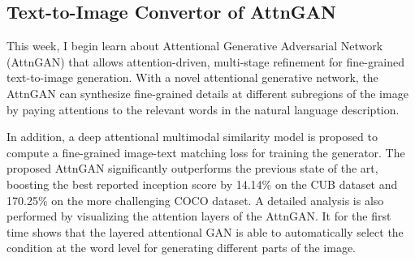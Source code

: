 \documentclass[a4paper]{article}
\begin{document}
	\subsection{Text-to-Image Convertor of AttnGAN}
	
	This week, I begin learn about Attentional Generative Adversarial Network (AttnGAN) that allows attention-driven, multi-stage refinement for fine-grained text-to-image generation. With a novel attentional generative network, the AttnGAN can synthesize fine-grained details at different subregions of the image by paying attentions to the relevant words in the natural language description. 
	
	In addition, a deep attentional multimodal similarity model is proposed to	compute a fine-grained image-text matching loss for training the generator. The proposed AttnGAN significantly outperforms the previous state of the art, boosting the best reported inception score by 14.14\% on the CUB dataset and 170.25\% on the more challenging COCO dataset. A detailed analysis is also performed by visualizing the attention layers of the AttnGAN. It for the first time shows that the layered attentional GAN is able to automatically select the condition at the word level for generating different parts of the image.
	
\end{document}
